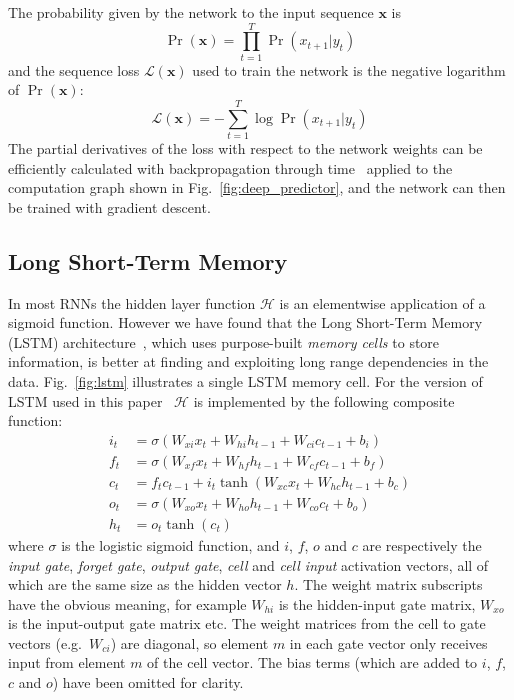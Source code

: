 \documentclass{article}
\newcommand{\eg}{e.g.\ }
\newcommand{\seclabel}[1]{\label{sec:#1}}
\newcommand{\fref}[1]{Fig.~\ref{fig:#1}}
\newcommand{\igate}{i}
\newcommand{\fgate}{f}
\newcommand{\ogate}{o}
\newcommand{\state}{c}
\newcommand{\hiddenfn}{\mathcal{H}}
\newcommand{\wtmat}[2]{W_{#1 #2}}
\newcommand{\seq}[1]{\mathbf{#1}}
\newcommand{\invble}{x}
\newcommand{\inseq}{\seq{\invble}}
\newcommand{\loss}{\mathcal{L}(\inseq)}
\begin{document}
The probability given by the network to the input sequence $\inseq$ is
\begin{equation}
\Pr(\inseq) = \prod_{t=1}^T{\Pr(x_{t+1}|y_t)}
\end{equation}
and the sequence loss $\loss$ used to train the network is the negative logarithm of $\Pr(\inseq)$:
\begin{equation}
\label{eq:loss}
\loss = -\sum_{t=1}^T{\log \Pr(x_{t+1}|y_t)}
\end{equation}
The partial derivatives of the loss with respect to the network weights can be efficiently calculated with backpropagation through time~\cite{williams95bptt} applied to the computation graph shown in \fref{deep_predictor}, and 
the network can then be trained with gradient descent.

\subsection{Long Short-Term Memory}
\seclabel{lstm}
In most RNNs the hidden layer function $\hiddenfn$ is an elementwise application of a sigmoid function.
However we have found that the Long Short-Term Memory (LSTM) architecture~\cite{hochreiter97lstm}, which uses purpose-built \emph{memory cells} to store information, is better at finding and exploiting long range dependencies in the data.
\fref{lstm} illustrates a single LSTM memory cell.
For the version of LSTM used in this paper~\cite{gers02peepholes} $\hiddenfn$ is implemented by the following composite function:
\begin{align}
\igate_t &= \sigma\left(\wtmat{x}{\igate} x_t + \wtmat{h}{\igate} h_{t-1} + \wtmat{\state}{\igate} \state_{t-1}  + b_\igate\right)\\
\fgate_t &= \sigma\left(\wtmat{x}{\fgate} x_t + \wtmat{h}{\fgate} h_{t-1} + \wtmat{\state}{\fgate} \state_{t-1} + b_\fgate \right)\\
\state_t &= \fgate_t \state_{t-1} + \igate_t \tanh \left(\wtmat{x}{\state} x_t + \wtmat{h}{\state} h_{t-1} + b_\state\right)\\
\ogate_t &= \sigma\left(\wtmat{x}{\ogate} x_t + \wtmat{h}{\ogate} h_{t-1} + \wtmat{\state}{\ogate} \state_{t} + b_\ogate\right)\\
h_t &= \ogate_t \tanh(\state_t)
\end{align}
where $\sigma$ is the logistic sigmoid function, and $\igate$, $\fgate$, $\ogate$ and $\state$ are respectively the \emph{input gate}, \emph{forget gate}, \emph{output gate}, \emph{cell} and \emph{cell input} activation vectors, all of which are the same size as the hidden vector $h$.
The weight matrix subscripts have the obvious meaning, for example $\wtmat{h}{\igate}$ is the hidden-input gate matrix, $\wtmat{x}{\ogate}$ is the input-output gate matrix etc.
The weight matrices from the cell to gate vectors (\eg $\wtmat{c}{\igate}$) are diagonal, so element $m$ in each gate vector only receives input from element $m$ of the cell vector.
The bias terms (which are added to $\igate$, $\fgate$, $\state$ and $\ogate$) have been omitted for clarity.
\end{document}
